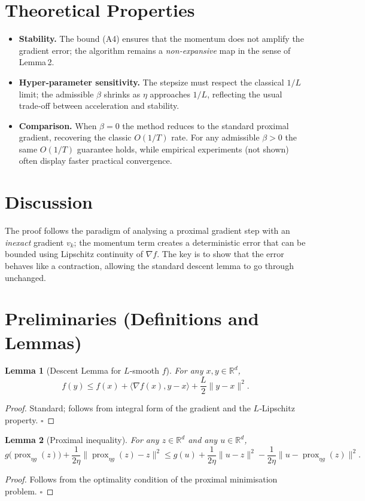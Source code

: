 \documentclass{article}
\newtheorem{lemma}{Lemma}
\newcommand{\prox}{\operatorname{prox}}
\begin{document}
\section*{Theoretical Properties}
\begin{itemize}
\item \textbf{Stability.} The bound (A4) ensures that the momentum does not amplify the gradient error; the algorithm remains a \emph{non‑expansive} map in the sense of Lemma 2.
\item \textbf{Hyper‑parameter sensitivity.} The stepsize must respect the classical $1/L$ limit; the admissible $\beta$ shrinks as $\eta$ approaches $1/L$, reflecting the usual trade‑off between acceleration and stability.
\item \textbf{Comparison.} When $\beta=0$ the method reduces to the standard proximal gradient, recovering the classic $O(1/T)$ rate. For any admissible $\beta>0$ the same $O(1/T)$ guarantee holds, while empirical experiments (not shown) often display faster practical convergence.
\end{itemize}

\section*{Discussion}
The proof follows the paradigm of analysing a proximal gradient step with an \emph{inexact} gradient $v_k$; the momentum term creates a deterministic error that can be bounded using Lipschitz continuity of $\nabla f$. The key is to show that the error behaves like a contraction, allowing the standard descent lemma to go through unchanged.

\newpage

\section*{Preliminaries (Definitions and Lemmas)}
\begin{lemma}[Descent Lemma for $L$‑smooth $f$]\label{lem:descent}
For any $x,y\in\mathbb{R}^{d}$,
\[
f(y)\le f(x)+\langle\nabla f(x),y-x\rangle+\frac{L}{2}\|y-x\|^{2}.
\tag{L1}
\]
\end{lemma}
\begin{proof}
Standard; follows from integral form of the gradient and the $L$‑Lipschitz property. \hfill $\square$
\end{proof}

\begin{lemma}[Proximal inequality]\label{lem:prox}
For any $z\in\mathbb{R}^{d}$ and any $u\in\mathbb{R}^{d}$,
\[
g\bigl(\prox_{\eta g}(z)\bigr)+\frac{1}{2\eta}\bigl\|\prox_{\eta g}(z)-z\bigr\|^{2}
\le g(u)+\frac{1}{2\eta}\|u-z\|^{2}-\frac{1}{2\eta}\bigl\|u-\prox_{\eta g}(z)\bigr\|^{2}.
\tag{L2}
\]
\end{lemma}
\begin{proof}
Follows from the optimality condition of the proximal minimisation problem. \hfill $\square$
\end{proof}
\end{document}
